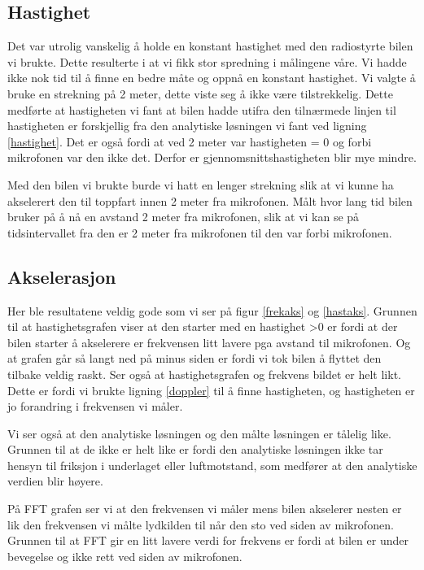 \documentclass[norsk,a4paper,12pt]{article}
\begin{document}
\subsection{Hastighet}

Det var utrolig vanskelig å holde en konstant hastighet med den radiostyrte bilen vi brukte. Dette resulterte i at vi fikk stor spredning i målingene våre. Vi hadde ikke nok tid til å finne en bedre måte og oppnå en konstant hastighet. Vi valgte å bruke en strekning på 2 meter, dette viste seg å ikke være tilstrekkelig. Dette medførte at hastigheten vi fant at bilen hadde utifra den tilnærmede linjen til hastigheten er forskjellig fra den analytiske løsningen vi fant ved ligning \ref{hastighet}. Det er også fordi at ved 2 meter var hastigheten = 0 og forbi mikrofonen var den ikke det. Derfor er gjennomsnittshastigheten blir mye mindre.

Med den bilen vi brukte burde vi hatt en lenger strekning slik at vi kunne ha akselerert den til toppfart innen 2 meter fra mikrofonen. Målt hvor lang tid bilen bruker på å nå en avstand 2 meter fra mikrofonen, slik at vi kan se på tidsintervallet fra den er 2 meter fra mikrofonen til den var forbi mikrofonen. 

\subsection{Akselerasjon}

Her ble resultatene veldig gode som vi ser på figur \ref{frekaks} og \vref{hastaks}. Grunnen til at hastighetsgrafen viser at den starter med en hastighet >0 er fordi at der bilen starter å akselerere er frekvensen litt lavere pga avstand til mikrofonen. Og at grafen går så langt ned på minus siden er fordi vi tok bilen å flyttet den tilbake veldig raskt. Ser også at hastighetsgrafen og frekvens bildet er helt likt. Dette er fordi vi brukte ligning \ref{doppler} til å finne hastigheten, og hastigheten er jo forandring i frekvensen vi måler. 

Vi ser også at den analytiske løsningen og den målte løsningen er tålelig like. Grunnen til at de ikke er helt like er fordi den analytiske løsningen ikke tar hensyn til friksjon i underlaget eller luftmotstand, som medfører at den analytiske verdien blir høyere.

På FFT grafen ser vi at den frekvensen vi måler mens bilen akselerer nesten er lik den frekvensen vi målte lydkilden til når den sto ved siden av mikrofonen. Grunnen til at FFT gir en litt lavere verdi for frekvens er fordi at bilen er under bevegelse og ikke rett ved siden av mikrofonen. 
\end{document}
